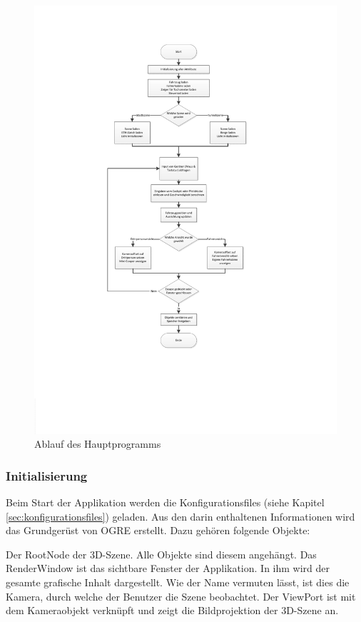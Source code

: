 \begin{figure}[H]
\centering 
\includegraphics[width=0.6\linewidth]{src/flowchart_mainapplication.pdf}
\caption{Ablauf des Hauptprogramms} %
\label{ablauf_hauptprogramm} %
\end{figure}

\newpage

\subsubsection{Initialisierung}

Beim Start der Applikation werden die Konfigurationsfiles (siehe Kapitel \ref{sec:konfigurationsfiles}) geladen. Aus den darin enthaltenen Informationen wird das Grundgerüst von OGRE erstellt. Dazu gehören folgende Objekte:

Der RootNode der 3D-Szene. Alle Objekte sind diesem angehängt.
Das RenderWindow ist das sichtbare Fenster der Applikation. In ihm wird der gesamte grafische Inhalt dargestellt.
Wie der Name vermuten lässt, ist dies die Kamera, durch welche der Benutzer die Szene beobachtet.
Der ViewPort ist mit dem Kameraobjekt verknüpft und zeigt die Bildprojektion der 3D-Szene an. 

